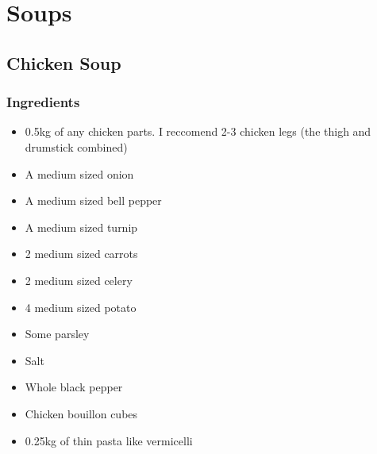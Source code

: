 \documentclass[
	11pt, %
	fleqn, %
	a4paper, %
]{LegrandOrangeBook}
\begin{document}

\part{Soups}
	\chapterspaceabove{6.75cm}
	\chapterspacebelow{7.25cm}

	\chapter{Chicken Soup}
		\section{Ingredients}
			\begin{itemize}
				\item 0.5kg of any chicken parts. I reccomend 2-3 chicken legs (the thigh and drumstick combined)
				\item A medium sized onion
				\item A medium sized bell pepper
				\item A medium sized turnip
				\item 2 medium sized carrots
				\item 2 medium sized celery
				\item 4 medium sized potato
				\item Some parsley
				\item Salt
				\item Whole black pepper
				\item Chicken bouillon cubes
				\item 0.25kg of thin pasta like vermicelli
			\end{itemize}
\end{document}
